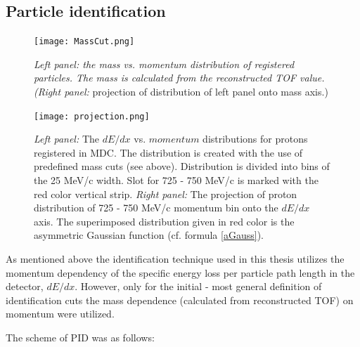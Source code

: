 \subsection{\label{PID} Particle identification}
\begin{figure}[!h]
		\centering
		\texttt{[image: MassCut.png]}
		\caption{{\it Left panel: the mass vs. momentum distribution of registered particles. The mass is calculated from the reconstructed TOF value. 
		(\it Right panel:} projection of distribution of left panel onto mass axis.) }
		\label{MassCuts}
	\end{figure}
	\begin{figure}[!h]
		\centering
		\texttt{[image: projection.png]}
		\caption{{\it Left panel:} The $dE/dx$ vs. $momentum$ distributions for protons registered in MDC. The distribution is created with the use of predefined
		mass cuts (see above). Distribution is divided into bins of the 25 MeV/c width. Slot for 725 - 750 MeV/c is marked with the red color vertical strip.
		{\it Right panel:} The projection of proton distribution of 725 - 750 MeV/c momentum bin onto the $dE/dx$ axis. The superimposed distribution given 
		in red color is the asymmetric Gaussian function (cf. formula \ref{aGauss}). 
		}
		\label{Projec}
	\end{figure}
As mentioned above the identification technique used in this thesis utilizes the momentum dependency of the specific energy loss 
per particle path length in the detector, $dE/dx$.
However, only for the initial - most general definition of identification cuts the 
mass dependence (calculated from reconstructed TOF) on momentum were utilized.

The scheme of PID was as follows:

